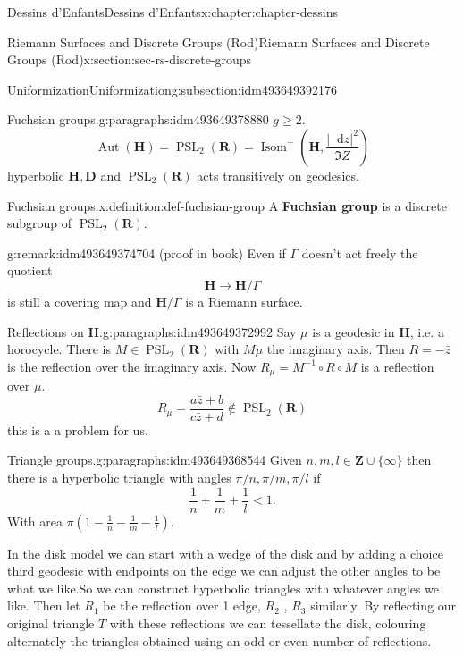 \documentclass[oneside,10pt,]{book}
\newcommand{\terminology}[1]{\textbf{#1}}
\numberwithin{equation}{section}
\newcommand{\diff}{\mathop{}\!\mathrm{d}}
\newcommand{\inv}{^{-1}}
\newcommand{\ZZ}{\mathbf{Z}}
\newcommand{\RR}{\mathbf{R}}
\newcommand{\HH}{\mathbf{H}}
\DeclareMathOperator{\Aut}{Aut}
\DeclareMathOperator{\PSL}{PSL}
\newcommand{\lt}{<}
\begin{document}
\begin{chapterptx}{Dessins d'Enfants}{}{Dessins d'Enfants}{}{}{x:chapter:chapter-dessins}
\begin{sectionptx}{Riemann Surfaces and Discrete Groups (Rod)}{}{Riemann Surfaces and Discrete Groups (Rod)}{}{}{x:section:sec-rs-discrete-groups}
\begin{subsectionptx}{Uniformization}{}{Uniformization}{}{}{g:subsection:idm493649392176}
\begin{paragraphs}{Fuchsian groups.}{g:paragraphs:idm493649378880}%
\(g \ge 2\).%
\begin{equation*}
\Aut (\HH) = \PSL_2(\RR) = \operatorname{Isom}^+ ( \HH, \frac{|\diff z|^2}{\Im Z})
\end{equation*}
hyperbolic \(\HH, \mathbf D\) and \(\PSL_2(\RR)\) acts transitively on geodesics.%
\begin{definition}{Fuchsian groups.}{x:definition:def-fuchsian-group}%
A \terminology{Fuchsian group} is a discrete subgroup of \(\PSL_2(\RR)\).%
\end{definition}
\begin{remark}{}{g:remark:idm493649374704}%
(proof in book) Even if \(\Gamma\) doesn't act freely the quotient%
\begin{equation*}
\HH \to \HH/\Gamma
\end{equation*}
is still a covering map and \(\HH/\Gamma\) is a Riemann surface.%
\end{remark}
\end{paragraphs}%
\begin{paragraphs}{Reflections on \(\HH\).}{g:paragraphs:idm493649372992}%
Say \(\mu\) is a geodesic in \(\HH\), i.e. a horocycle. There is \(M \in \PSL_2(\RR)\) with \(M\mu\) the imaginary axis. Then \(R = -\bar z\) is the reflection  over the imaginary axis. Now \(R_\mu = M\inv\circ R \circ M\) is a reflection over \(\mu\).%
\begin{equation*}
R_\mu = \frac{a\bar z  + b}{ c\bar z + d}\not\in \PSL_2(\RR)
\end{equation*}
this is a a problem for us.%
\end{paragraphs}%
\begin{paragraphs}{Triangle groups.}{g:paragraphs:idm493649368544}%
Given \(n, m, l\in \ZZ \cup \{\infty\}\) then there is a hyperbolic triangle with angles \(\pi/n,\pi/m, \pi/l\) if%
\begin{equation*}
\frac 1n + \frac 1m + \frac 1l \lt 1\text{.}
\end{equation*}
With area \(\pi(1 -  \frac 1n - \frac 1m - \frac 1l)\).%
\par
In the disk model we can start with a wedge of the disk and by adding a choice third geodesic with endpoints on the edge we can adjust the other angles to be what we like.So we can construct hyperbolic triangles with whatever angles we like. Then let \(R_1\) be the reflection over 1 edge, \(R_2\) , \(R_3\) similarly. By reflecting our original triangle \(T\) with these reflections we can tessellate the disk, colouring alternately the triangles obtained using an odd or even number of reflections.%

\end{paragraphs}
\end{subsectionptx}
\end{sectionptx}
\end{chapterptx}
\end{document}

